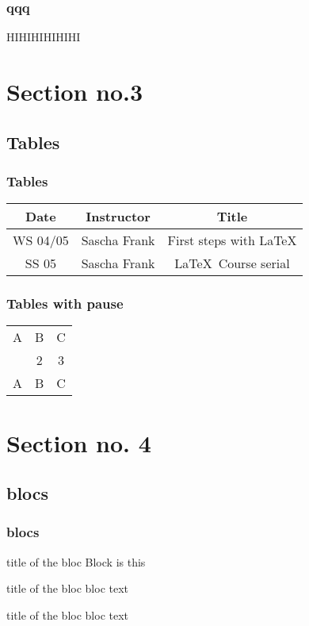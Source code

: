 \documentclass{beamer}
\begin{document}
\begin{frame}
    \frametitle{qqq}
    HIHIHIHIHIHI
\end{frame}




\section{Section no.3} 
\subsection{Tables}
\begin{frame}
\frametitle{Tables}
\begin{tabular}{|c|c|c|}
\hline
\textbf{Date} & \textbf{Instructor} & \textbf{Title} \\
\hline
WS 04/05 & Sascha Frank & First steps with  \LaTeX  \\
\hline
SS 05 & Sascha Frank & \LaTeX \ Course serial \\
\hline
\end{tabular}
\end{frame}


    \begin{frame}
\frametitle{Tables with pause}
\begin{tabular}{c c c}
A & B & C \\ 
\pause 
1 & 2 & 3 \\  
\pause 
A & B & C \\ 
\end{tabular} 
    \end{frame}


\section{Section no. 4}
\subsection{blocs}
\begin{frame}
\frametitle{blocs}

\begin{block}{title of the bloc}
Block is this
\end{block}

\begin{exampleblock}{title of the bloc}
bloc text
\end{exampleblock}


\begin{alertblock}{title of the bloc}
bloc text
\end{alertblock}
\end{frame}


\end{document}
